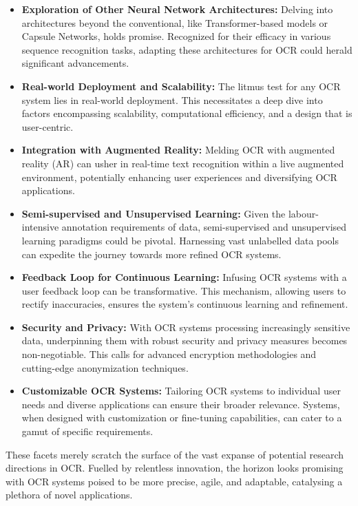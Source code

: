 \begin{itemize}
    \item \textbf{Exploration of Other Neural Network Architectures:} Delving into architectures beyond the conventional, like Transformer-based models or Capsule Networks, holds promise. Recognized for their efficacy in various sequence recognition tasks, adapting these architectures for OCR could herald significant advancements.

    \item \textbf{Real-world Deployment and Scalability:} The litmus test for any OCR system lies in real-world deployment. This necessitates a deep dive into factors encompassing scalability, computational efficiency, and a design that is user-centric.

    \item \textbf{Integration with Augmented Reality:} Melding OCR with augmented reality (AR) can usher in real-time text recognition within a live augmented environment, potentially enhancing user experiences and diversifying OCR applications.

    \item \textbf{Semi-supervised and Unsupervised Learning:} Given the labour-intensive annotation requirements of data, semi-supervised and unsupervised learning paradigms could be pivotal. Harnessing vast unlabelled data pools can expedite the journey towards more refined OCR systems.

    \item \textbf{Feedback Loop for Continuous Learning:} Infusing OCR systems with a user feedback loop can be transformative. This mechanism, allowing users to rectify inaccuracies, ensures the system's continuous learning and refinement.

    \item \textbf{Security and Privacy:} With OCR systems processing increasingly sensitive data, underpinning them with robust security and privacy measures becomes non-negotiable. This calls for advanced encryption methodologies and cutting-edge anonymization techniques.

    \item \textbf{Customizable OCR Systems:} Tailoring OCR systems to individual user needs and diverse applications can ensure their broader relevance. Systems, when designed with customization or fine-tuning capabilities, can cater to a gamut of specific requirements.
\end{itemize}

These facets merely scratch the surface of the vast expanse of potential research directions in OCR. Fuelled by relentless innovation, the horizon looks promising with OCR systems poised to be more precise, agile, and adaptable, catalysing a plethora of novel applications.





